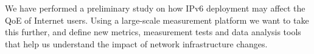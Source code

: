 We have performed a preliminary study on how IPv6 deployment may affect the
\ac{QoE} of Internet users. Using a large-scale measurement platform we want
to take this further, and define new metrics, measurement tests and data
analysis tools that help us understand the impact of network infrastructure
changes.
